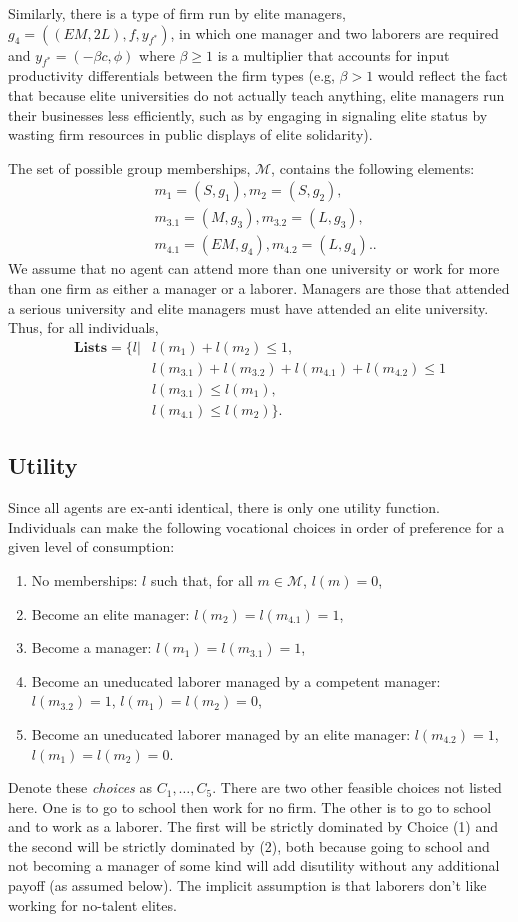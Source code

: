 \documentclass[12pt,letterpaper]{article}
\begin{document}
	Similarly, there is a type of firm run by elite managers,   $g_4=((EM,2L),f,y_{f^\ast})$, in which one manager and two laborers are required and $y_{f^\ast}=(- \beta c,\phi)$ where $\beta\ge 1$ is a multiplier that accounts for input productivity differentials between the firm types (e.g, $\beta>1$ would reflect the fact that because elite universities do not actually teach anything, elite managers run their businesses less efficiently, such as by engaging in  signaling elite status by wasting firm resources in public displays of elite solidarity).
	
	The set of possible group memberships, $\mathcal{M}$, contains the following elements:
	\begin{align*}
		&m_1=(S,g_1),m_2=(S,g_2),\\
		&m_{3.1}=(M,g_3),m_{3.2}=(L,g_3),\\
		&m_{4.1}=(EM,g_4),m_{4.2}=(L,g_4).
		.
	\end{align*}
	We assume that no agent can attend more than one university or work for more than one firm as either a manager or a laborer.
	Managers are those that attended a serious university and elite managers must have attended an elite university. 
	Thus, for all individuals,
	\begin{align*}
		\textbf{Lists}=\Big\{l|
		&l(m_1)+l(m_2)\le1,\\
		&l(m_{3.1})+l(m_{3.2})+l(m_{4.1})+l(m_{4.2})\le1\\
		&l(m_{3.1})\le l(m_1),\\
		&l(m_{4.1})\le l(m_2)\Big\}.
	\end{align*}
	
	\subsection{Utility}
	Since all agents are ex-anti identical, there is only one utility function.
	Individuals can make the following vocational choices in order of preference for a given level of consumption:
	\begin{enumerate}
		\item No memberships: $l$ such that, for all $m\in\mathcal{M}$, $l(m)=0$,
		\item Become an elite manager: $l(m_2)=l(m_{4.1})=1$,
		\item Become a manager: $l(m_1)=l(m_{3.1})=1$,
		\item Become an uneducated laborer managed by a competent manager: $l(m_{3.2})=1$, $l(m_1)=l(m_2)=0$,
		\item Become an uneducated laborer managed by an elite manager: $l(m_{4.2})=1$, $l(m_1)=l(m_2)=0$.
	\end{enumerate}
	Denote these \textit{choices} as $C_1,\ldots,C_5$.
	There are two other feasible choices not listed here. 
	One is to go to school then work for no firm. 
	The other is to go to school and to work as a laborer. 
	The first will be strictly dominated by Choice (1) and the second will be strictly dominated by (2), both because going to school and not becoming a manager of some kind will add disutility without any additional payoff (as assumed below).
	The implicit assumption is that laborers don't like working for no-talent elites. 
	
\end{document}
